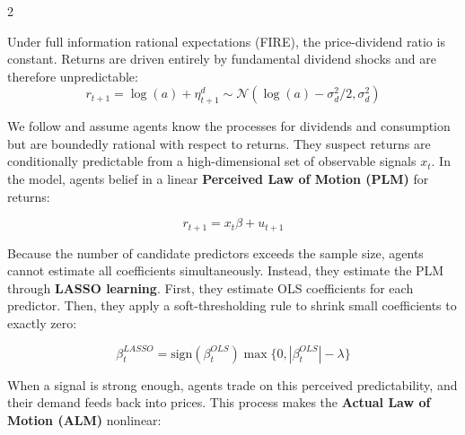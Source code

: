\documentclass[a0,portrait]{a0poster}
\begin{document}
\begin{multicols*}{2}
\begin{tcolorbox}[colback=white, colframe=UoCBlue, title=Environment and Benchmark, toptitle=10pt, bottomtitle=10pt, fonttitle=\bfseries]
\vspace{0.5cm}
Under full information rational expectations (FIRE), the price-dividend ratio is constant. Returns are driven entirely by fundamental dividend shocks and are therefore unpredictable:
\begin{equation}
    r_{t+1} = \log(a) + \eta_{t+1}^{d} \sim \mathcal{N}(\log(a) - \sigma_{d}^{2}/2, \sigma_{d}^{2})
\end{equation}

\vspace{0.5cm}
\end{tcolorbox}







\begin{tcolorbox}[colback=white,colframe=UoCBlue, title = Bounded Rationality and LASSO Learning, toptitle=10pt, bottomtitle=10pt, fonttitle=\bfseries]

\vspace{0.5cm}
We follow \textcite{adam2016stock} and assume agents know the processes for dividends and consumption but are boundedly rational with respect to returns.
They suspect returns are conditionally predictable from a high-dimensional set of observable signals $x_t$.
In the model, agents belief in a linear \textbf{Perceived Law of Motion (PLM)} for returns:

\vspace{0.05cm}
\begin{equation}
    r_{t+1} = x_{t}\beta + u_{t+1}
\end{equation}
\vspace{0.05cm}

Because the number of candidate predictors exceeds the sample size, agents cannot estimate all coefficients simultaneously.
Instead, they estimate the PLM through \textbf{LASSO learning}.
First, they estimate OLS coefficients for each predictor.
Then, they apply a soft-thresholding rule to shrink small coefficients to exactly zero:

\vspace{0.05cm}
\begin{equation}
     \beta^{LASSO}_t = \text{sign}(\beta^{OLS}_t)\max\{0, |\beta^{OLS}_t| - \lambda\}
\end{equation}
\vspace{0.05cm}

When a signal is strong enough, agents trade on this perceived predictability, and their demand feeds back into prices. This process makes the \textbf{Actual Law of Motion (ALM)} nonlinear:


\end{tcolorbox}
\end{multicols*}
\end{document}
